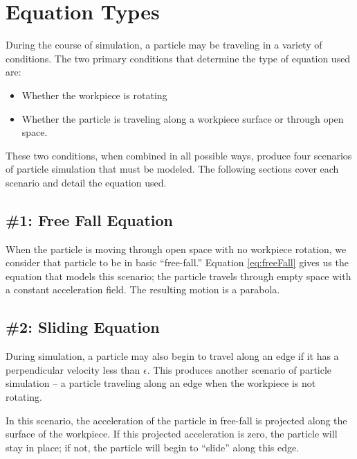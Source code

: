 \section{Equation Types}

During the course of simulation, a particle may be traveling in a variety of conditions. The two primary conditions that determine the type of equation used are:

\begin{itemize}
	\item Whether the workpiece is rotating
	\item Whether the particle is traveling along a workpiece surface or through open space.
\end{itemize}

These two conditions, when combined in all possible ways, produce four scenarios of particle simulation that must be modeled. The following sections cover each scenario and detail the equation used.

		\subsection{\#1: Free Fall Equation}

When the particle is moving through open space with no workpiece rotation, we consider that particle to be in basic ``free-fall.'' Equation \eqref{eq:freeFall} gives us the equation that models this scenario; the particle travels through empty space with a constant acceleration field. The resulting motion is a parabola.


		\subsection{\#2: Sliding Equation}

During simulation, a particle may also begin to travel along an edge if it has a perpendicular velocity less than $\epsilon$. This produces another scenario of particle simulation -- a particle traveling along an edge when the workpiece is not rotating.


In this scenario, the acceleration of the particle in free-fall is projected along the surface of the workpiece. If this projected acceleration is zero, the particle will stay in place; if not, the particle will begin to ``slide'' along this edge.

